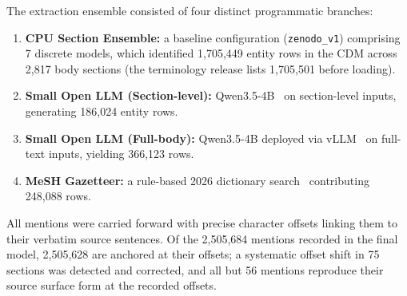 \documentclass[referee,lineno,pdflatex,sn-vancouver-num]{sn-jnl}
\theoremstyle{thmstyleone}%
\theoremstyle{thmstyletwo}%
\theoremstyle{thmstylethree}%
\begin{document}
The extraction ensemble consisted of four distinct programmatic branches:
\begin{enumerate}
\item \textbf{CPU Section Ensemble:} a baseline configuration
(\texttt{zenodo\_v1}) comprising 7 discrete models, which identified
1,705,449 entity rows in the CDM across 2,817 body sections (the terminology
release lists 1,705,501 before loading).
\item \textbf{Small Open LLM (Section-level):} Qwen3.5-4B~\cite{qwen35card} on section-level inputs, generating 186,024 entity rows.
\item \textbf{Small Open LLM (Full-body):} Qwen3.5-4B deployed via
vLLM~\cite{qwen35card,kwon2023vllm} on full-text inputs, yielding 366,123
rows.
\item \textbf{MeSH Gazetteer:} a rule-based 2026 dictionary
search~\cite{lipscomb2000mesh} contributing 248,088 rows.
\end{enumerate}

All mentions were carried forward with precise character offsets linking
them to their verbatim source sentences. Of the 2,505,684 mentions recorded
in the final model, 2,505,628 are anchored at their offsets; a systematic
offset shift in 75 sections was detected and corrected, and all but 56
mentions reproduce their source surface form at the recorded offsets.
\end{document}
